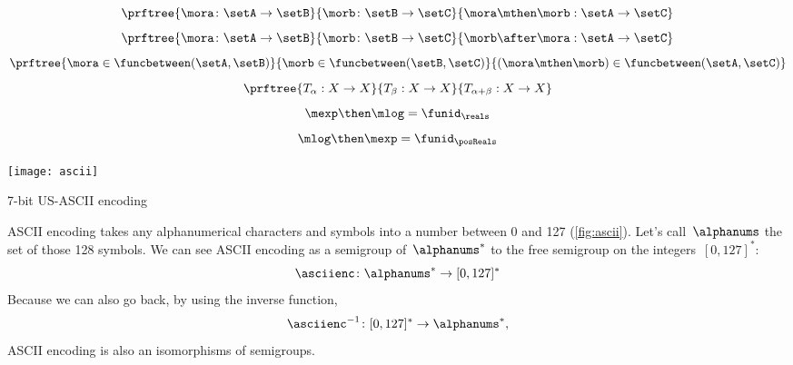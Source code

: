{\begin{forslides}
    \begin{equation}
      \label{eq:funccomp1}
      \prftree{\mora \colon \setA \to \setB}{\morb \colon \setB \to \setC}{\mora \mthen \morb : \setA \to \setC}
    \end{equation}
    \begin{equation}
      \label{eq:funccomp2}
      \prftree{\mora \colon \setA \to \setB}{\morb \colon \setB \to \setC}{\morb \after \mora : \setA \to \setC}
    \end{equation}
    \begin{equation}
      \label{eq:funccomp3}
      \prftree{%
        \mora \in \funcbetween(\setA, \setB)}{%
        \morb \in \funcbetween( \setB, \setC)}{
        (\mora \mthen \morb) \in \funcbetween( \setA, \setC)}
    \end{equation}
    \begin{equation}
      \label{eq:transitions}
      \prftree{T_\alpha: X \to X }{T_\beta : X \to X}{T_{\alpha+\beta} : X \to X}
    \end{equation}
    \begin{equation}
      \label{eq:explogid}
      \mexp \then \mlog = \funid_{\reals}
    \end{equation}
    \begin{equation}
      \label{eq:logexpid}
      \mlog \then \mexp = \funid_{\posReals}
    \end{equation}
  \end{forslides}
}%

\begin{marginfigure}
  \texttt{[image: ascii]}
  \caption{7-bit US-ASCII encoding }
  \label{fig:ascii}
\end{marginfigure}

\begin{example}
  ASCII encoding takes any alphanumerical characters and symbols into a number between 0 and 127 (\cref{fig:ascii}).
  Let's call~$\alphanums$ the set of those 128 symbols.
  We can see ASCII encoding as a semigroup \whomo of~$\alphanums^*$ to the free semigroup on the integers~$[0,127]^*$:
  \begin{equation*}
    \label{eq:ASCII-semi}
    \asciienc\colon \alphanums^* \to  [0,127]^*
  \end{equation*}
  Because we can also go back, by using the inverse function,
  \begin{equation*}
    \label{eq:ASCII-semi-inv}
    \asciienc^{-1}\colon  [0,127]^*  \to  \alphanums^*,
  \end{equation*}
  ASCII encoding is also an isomorphisms of semigroups.
\end{example}

